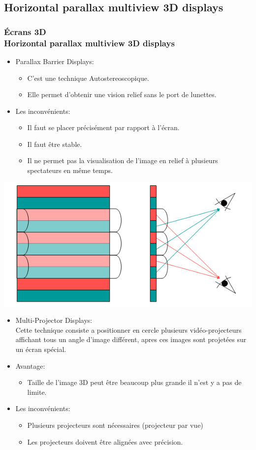 	\subsection{Horizontal parallax multiview 3D displays}	

	\begin{frame}

	  \frametitle{Écrans 3D \\Horizontal parallax multiview 3D displays} 
			
	\begin{itemize}
	\item Parallax Barrier Displays:
								
\begin{itemize}
\item C’est une technique Autostereoscopique.
\item Elle permet d'obtenir une vision relief sans le port de lunettes.
\end{itemize}
\item Les inconvénients:
\begin{itemize} 	
\item	Il faut se placer précisément par rapport à l’écran.
\item Il faut être stable.
\item Il ne permet pas la visualisation de l’image en relief à plusieurs spectateurs en même temps.
	\end{itemize}
		\end{itemize}
	\includegraphics[keepaspectratio,height=.2\linewidth]{4.png}
	\end{frame}
	
	\begin{frame}
\begin{itemize}
\item Multi-Projector Displays:\\
Cette technique consiste a positionner en cercle plusieurs vidéo-projecteurs affichant tous un angle d’image différent, apres ces images sont projetées sur un écran spécial. 						
\item Avantage:
\begin{itemize} 
\item Taille de l’image 3D peut être beaucoup plus grande
il n’est y a pas de limite.
	\end{itemize}
\item Les inconvénients:
\begin{itemize} 	
\item	Plusieurs projecteurs sont nécessaires (projecteur par vue)
\item Les projecteurs doivent être alignées avec précision.
	\end{itemize}
		\end{itemize}
	\end{frame}

